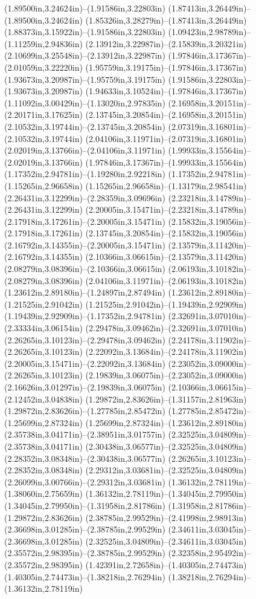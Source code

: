 (1.89500in,3.24624in)--(1.91586in,3.22803in) (1.87413in,3.26449in)--(1.89500in,3.24624in) (1.85326in,3.28279in)--(1.87413in,3.26449in) (1.88373in,3.15922in)--(1.91586in,3.22803in) (1.09423in,2.98789in)--(1.11259in,2.94836in) (2.13912in,3.22987in)--(2.15839in,3.20321in) (2.10699in,3.25548in)--(2.13912in,3.22987in) (1.97846in,3.17367in)--(2.01059in,3.22220in) (1.95759in,3.19175in)--(1.97846in,3.17367in) (1.93673in,3.20987in)--(1.95759in,3.19175in) (1.91586in,3.22803in)--(1.93673in,3.20987in) (1.94633in,3.10524in)--(1.97846in,3.17367in) (1.11092in,3.00429in)--(1.13020in,2.97835in) (2.16958in,3.20151in)--(2.20171in,3.17625in) (2.13745in,3.20854in)--(2.16958in,3.20151in) (2.10532in,3.19744in)--(2.13745in,3.20854in) (2.07319in,3.16801in)--(2.10532in,3.19744in) (2.04106in,3.11971in)--(2.07319in,3.16801in) (2.02019in,3.13766in)--(2.04106in,3.11971in) (1.99933in,3.15564in)--(2.02019in,3.13766in) (1.97846in,3.17367in)--(1.99933in,3.15564in) (1.17352in,2.94781in)--(1.19280in,2.92218in) (1.17352in,2.94781in)--(1.15265in,2.96658in) (1.15265in,2.96658in)--(1.13179in,2.98541in) (2.26431in,3.12299in)--(2.28359in,3.09696in) (2.23218in,3.14789in)--(2.26431in,3.12299in) (2.20005in,3.15471in)--(2.23218in,3.14789in) (2.17918in,3.17261in)--(2.20005in,3.15471in) (2.15832in,3.19056in)--(2.17918in,3.17261in) (2.13745in,3.20854in)--(2.15832in,3.19056in) (2.16792in,3.14355in)--(2.20005in,3.15471in) (2.13579in,3.11420in)--(2.16792in,3.14355in) (2.10366in,3.06615in)--(2.13579in,3.11420in) (2.08279in,3.08396in)--(2.10366in,3.06615in) (2.06193in,3.10182in)--(2.08279in,3.08396in) (2.04106in,3.11971in)--(2.06193in,3.10182in) (1.23612in,2.89180in)--(1.24897in,2.87494in) (1.23612in,2.89180in)--(1.21525in,2.91042in) (1.21525in,2.91042in)--(1.19439in,2.92909in) (1.19439in,2.92909in)--(1.17352in,2.94781in) (2.32691in,3.07010in)--(2.33334in,3.06154in) (2.29478in,3.09462in)--(2.32691in,3.07010in) (2.26265in,3.10123in)--(2.29478in,3.09462in) (2.24178in,3.11902in)--(2.26265in,3.10123in) (2.22092in,3.13684in)--(2.24178in,3.11902in) (2.20005in,3.15471in)--(2.22092in,3.13684in) (2.23052in,3.09000in)--(2.26265in,3.10123in) (2.19839in,3.06075in)--(2.23052in,3.09000in) (2.16626in,3.01297in)--(2.19839in,3.06075in) (2.10366in,3.06615in)--(2.12452in,3.04838in) (1.29872in,2.83626in)--(1.31157in,2.81963in) (1.29872in,2.83626in)--(1.27785in,2.85472in) (1.27785in,2.85472in)--(1.25699in,2.87324in) (1.25699in,2.87324in)--(1.23612in,2.89180in) (2.35738in,3.04171in)--(2.38951in,3.01757in) (2.32525in,3.04809in)--(2.35738in,3.04171in) (2.30438in,3.06577in)--(2.32525in,3.04809in) (2.28352in,3.08348in)--(2.30438in,3.06577in) (2.26265in,3.10123in)--(2.28352in,3.08348in) (2.29312in,3.03681in)--(2.32525in,3.04809in) (2.26099in,3.00766in)--(2.29312in,3.03681in) (1.36132in,2.78119in)--(1.38060in,2.75659in) (1.36132in,2.78119in)--(1.34045in,2.79950in) (1.34045in,2.79950in)--(1.31958in,2.81786in) (1.31958in,2.81786in)--(1.29872in,2.83626in) (2.38785in,2.99529in)--(2.41998in,2.98913in) (2.36698in,3.01285in)--(2.38785in,2.99529in) (2.34611in,3.03045in)--(2.36698in,3.01285in) (2.32525in,3.04809in)--(2.34611in,3.03045in) (2.35572in,2.98395in)--(2.38785in,2.99529in) (2.32358in,2.95492in)--(2.35572in,2.98395in) (1.42391in,2.72658in)--(1.40305in,2.74473in) (1.40305in,2.74473in)--(1.38218in,2.76294in) (1.38218in,2.76294in)--(1.36132in,2.78119in) 